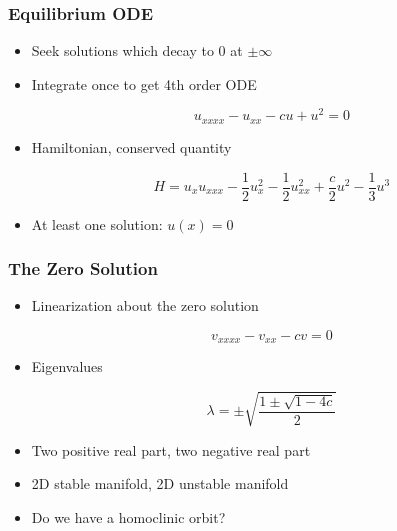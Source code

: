 \documentclass[16pt]{beamer}
\begin{document}
\begin{frame}
	\frametitle{Equilibrium ODE}
	\fontsize{16}{7.2}\selectfont
	\begin{itemize}
		\item<1->Seek solutions which decay to 0 at $\pm \infty$
		\vspace{0.5cm}
		\item<2->Integrate once to get 4th order ODE 
		\begin{center}
		\[u_{xxxx} - u_{xx} - cu + u^2 = 0\]
		\end{center}
		\vspace{0.5cm}
		\item<3->Hamiltonian, conserved quantity
		\begin{center}
		\[
		H = u_x u_{xxx} - \frac{1}{2}u_x^2 - \frac{1}{2}u_{xx}^2 + \frac{c}{2}u^2 - \frac{1}{3}u^3
		\]
		\end{center}
		\item<4->At least one solution: $u(x) = 0$
	\end{itemize} 
\end{frame}

\begin{frame}
	\frametitle{The Zero Solution}
	\fontsize{16}{7.2}\selectfont
	\begin{itemize}
		\item<1->Linearization about the zero solution
		\begin{center}
		\[v_{xxxx} - v_{xx} - c v = 0 \]
		\end{center}
		\item<2->Eigenvalues
		\begin{center}
		\[ \lambda = \pm \sqrt{ \frac{1 \pm \sqrt{1 - 4c } }{ 2} } \]
		\end{center}
		\item<3->Two positive real part, two negative real part
		\item<4->2D stable manifold, 2D unstable manifold
		\item<5->Do we have a homoclinic orbit?
	\end{itemize}
\end{frame}
\end{document}
